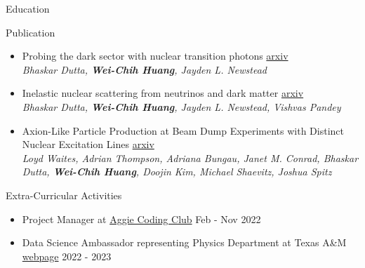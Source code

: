 \documentclass{resume}
\begin{document}
\begin{rSection}{Education}
\begin{rSection}{Publication}
    \begin{itemize}
        \item Probing the dark sector with nuclear transition photons \hfill \href{https://arxiv.org/pdf/2302.10250.pdf}{arxiv}\\
        {\footnotesize \it Bhaskar Dutta, \textbf{Wei-Chih Huang}, Jayden L. Newstead}
        \item Inelastic nuclear scattering from neutrinos and dark matter \hfill \href{https://arxiv.org/pdf/2206.08590.pdf}{arxiv}\\
        {\footnotesize \it Bhaskar Dutta, \textbf{Wei-Chih Huang}, Jayden L. Newstead, Vishvas Pandey}
        \item Axion-Like Particle Production at Beam Dump Experiments with Distinct Nuclear Excitation Lines \hfill \href{https://arxiv.org/pdf/2207.13659.pdf}{arxiv}\\
        {\footnotesize \it Loyd Waites, Adrian Thompson, Adriana Bungau, Janet M. Conrad, Bhaskar Dutta, \textbf{Wei-Chih Huang}, Doojin Kim, Michael Shaevitz, Joshua Spitz}
    \end{itemize}
\end{rSection}


\begin{rSection}{Extra-Curricular Activities}
    \begin{itemize}
        \item Project Manager at \href{https://aggiecodingclub.com/}{Aggie Coding Club} \hfill Feb - Nov 2022
        \item Data Science Ambassador representing Physics Department at Texas A\&M \href{https://noctildon.github.io/programming/DS_ambassador/index.html}{webpage} \hfill 2022 - 2023
    \end{itemize}
\end{rSection}






\end{rSection}
\end{document}
